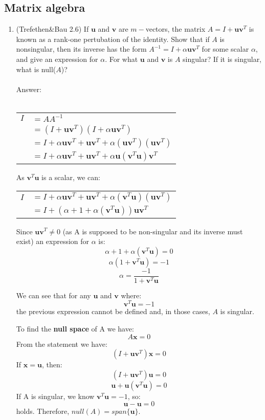 \documentclass{article}
\renewcommand{\vec}[1]{\mathbf{#1}}
\begin{document}
\subsection*{Matrix algebra}
\begin{enumerate}
\setcounter{enumi}{0}
\item (Trefethen\&Bau 2.6) If $\vec{u}$ and $\vec{v}$ are $m-$vectors, the matrix $A = I+\vec{u}\vec{v}^T$ is known as a rank-one
  pertubation of the identity.  Show that if $A$ is nonsingular, then its inverse has the form $A^{-1} = I + \alpha
  \vec{u} \vec{v}^T$ for some scalar $\alpha$, and give an expression for $\alpha$.  For what $\vec{u}$ and $\vec{v}$ is
  $A$ singular?  If it is singular, what is null($A$)?\\
\\
Answer:\\
\\
\begin{tabular}{rl}
$I$ & $= AA^{-1}$ \\
& $= (I+\vec{u}\vec{v}^T)(I+\alpha\vec{u}\vec{v}^T)$ \\
& $= I+\alpha\vec{u}\vec{v}^T+\vec{u}\vec{v}^T+\alpha(\vec{u}\vec{v}^T)(\vec{u}\vec{v}^T)$\\
& $= I+\alpha\vec{u}\vec{v}^T+\vec{u}\vec{v}^T+\alpha\vec{u}(\vec{v}^T\vec{u})\vec{v}^T$\\
\end{tabular}

As $\vec{v}^T\vec{u}$ is a scalar, we can:

\begin{tabular}{rl}
$I$ & $= I+\alpha\vec{u}\vec{v}^T+\vec{u}\vec{v}^T+\alpha(\vec{v}^T\vec{u})(\vec{u}\vec{v}^T)$\\
& $= I+(\alpha+1+\alpha(\vec{v}^T\vec{u}))\vec{u}\vec{v}^T$\\
\end{tabular}

Since $\vec{u}\vec{v}^T\neq0$ (as A is supposed to be non-singular and its inverse must exist) an expression for $\alpha$ is:
$$\alpha+1+\alpha(\vec{v}^T\vec{u})=0$$
$$\alpha(1+\vec{v}^T\vec{u})=-1$$
$$\alpha=\frac{-1}{1+\vec{v}^T\vec{u}}$$

We can see that for any $\vec{u}$ and $\vec{v}$ where:
$$\vec{v}^T\vec{u}=-1$$
the previous expression cannot be defined and, in those cases, $A$ is singular.

To find the \textbf{null space} of A we have:
$$A\vec{x}=0$$
From the statement we have:
$$(I+\vec{u}\vec{v}^T)\vec{x}=0$$
If $\vec{x}=\vec{u}$, then:
$$(I+\vec{u}\vec{v}^T)\vec{u}=0$$
$$\vec{u}+\vec{u}(\vec{v}^T\vec{u})=0$$
If A is singular, we know $\vec{v}^T\vec{u}=-1$, so:
$$\vec{u}-\vec{u}=0$$
holds.  Therefore, $null(A)=span \{ \vec{u} \}$.


\end{enumerate}
\end{document}
